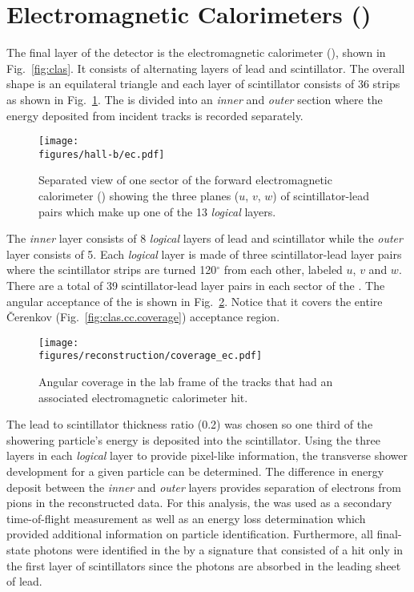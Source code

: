 \section{Electromagnetic Calorimeters ()}\label{sec:clas.ec}

The final layer of the  detector is the electromagnetic calorimeter ()\cite{clas.ec}, shown in Fig.~\ref{fig:clas}. It consists of alternating layers of lead and scintillator. The overall shape is an equilateral triangle and each layer of scintillator consists of 36 strips as shown in Fig.~\ref{fig:clas.ec}. The  is divided into an \emph{inner} and \emph{outer} section where the energy deposited from incident tracks is recorded separately.

\begin{figure}\begin{center}
\texttt{[image: \\figures/hall-b/ec.pdf]}
\caption[Electromagnetic Calorimeter Layers]{\label{fig:clas.ec}{}Separated view of one sector of the forward electromagnetic calorimeter () showing the three planes ($u$, $v$, $w$) of scintillator-lead pairs which make up one of the 13 \emph{logical} layers.}
\end{center}\end{figure}

The \emph{inner} layer consists of 8 \emph{logical} layers of lead and scintillator while the \emph{outer} layer consists of 5. Each \emph{logical} layer is made of three scintillator-lead layer pairs where the scintillator strips are turned 120$^\circ$ from each other, labeled $u$, $v$ and $w$. There are a total of 39 scintillator-lead layer pairs in each sector of the . The angular acceptance of the  is shown in Fig.~\ref{fig:clas.ec.coverage}. Notice that it covers the entire \v{C}erenkov (Fig.~\ref{fig:clas.cc.coverage}) acceptance region.

\begin{figure}\begin{center}
\texttt{[image: \\figures/reconstruction/coverage\_ec.pdf]}
\caption[Electromagnetic Calorimeter Angular Coverage]{\label{fig:clas.ec.coverage}{}Angular coverage in the lab frame of the tracks that had an associated electromagnetic calorimeter hit.}
\end{center}\end{figure}

The lead to scintillator thickness ratio (0.2) was chosen so one third of the showering particle's energy is deposited into the scintillator. Using the three layers in each \emph{logical} layer to provide pixel-like information, the transverse shower development for a given particle can be determined. The difference in energy deposit between the \emph{inner} and \emph{outer} layers provides separation of electrons from pions in the reconstructed data. For this analysis, the  was used as a secondary time-of-flight measurement as well as an energy loss determination which provided additional information on particle identification. Furthermore, all final-state photons were identified in the  by a signature that consisted of a hit only in the first layer of scintillators since the photons are absorbed in the leading sheet of lead.
